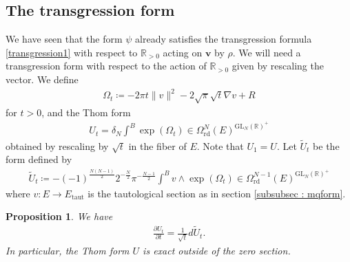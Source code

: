 \documentclass[a4paper,11pt]{amsart} %
\newcommand{\8}{\infty}
\newcommand{\vbf}{\mathbf{v}}
\newcommand{\GL}{\mathrm{GL}}
\newcommand{\Util}{\widetilde{U}}
\newcommand{\R}{\mathbb{R}}
\newcommand{\rd}{\textrm{rd}}
\newcommand{\taut}{\textrm{taut}}
\theoremstyle{mytheoremstyle}
\newtheorem{prop}[thm]{Proposition}
\theoremstyle{remark}
\numberwithin{equation}{section}
\begin{document}
\subsection{The transgression form} \label{transgression}
We have seen that the form $\psi$ already satisfies the transgression formula \eqref{transgression1} with respect to $\R_{>0}$ acting on $\vbf$ by $\rho$. We will need a transgression form with respect to the action of $\R_{>0}$ given by rescaling the vector. We define
\begin{align}
\Omega_t \coloneqq -2\pi t \lVert v \rVert^2-2\sqrt{\pi}\sqrt{t}\nabla v +R
\end{align}
for $t>0$, and the Thom form
\begin{align}
U_t = \delta_N \int^B\exp(\Omega_t) \in \Omega^N_{\rd}(E)^{\GL_N(\R)^+}
\end{align}
obtained by rescaling by $\sqrt{t}$ in the fiber of $E$. Note that $U_1=U$.
Let $\Util_t$ be the form defined by
\begin{align}
\Util_t\coloneqq -(-1)^{\frac{N(N-1)}{2}}2^{-\frac{N}{2}}\pi^{-\frac{N-1}{2}} \int^B v \wedge \exp(\Omega_t) \in  \Omega^{N-1}_{\rd}(E)^{\GL_N(\R)^+}
\end{align}
where $v \colon E \rightarrow E_{\taut}$ is the tautological section as in section \ref{subsubsec : mqform}.
\begin{prop} \label{prop transgression}
We have 
\begin{align}
\frac{\partial U_t}{\partial t}=\frac{1}{\sqrt{t}}d\Util_t.
\end{align}
In particular, the Thom form $U$ is exact outside of the zero section.
\end{prop}
\end{document}
